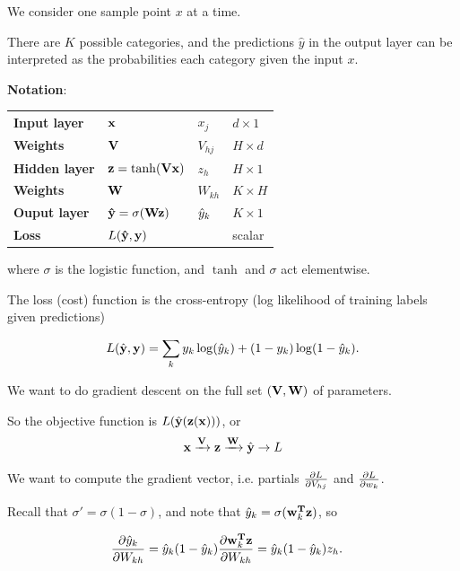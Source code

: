 \documentclass[12pt]{article}
\begin{document}
We consider one sample point $x$ at a time.

There are $K$ possible categories, and the predictions $\hat y$ in the output
layer can be interpreted as the probabilities each category given the input $x$.

\textbf{Notation}:

\begin{tabular}{l|l|l|l}
  \textbf{Input layer}  & $\mathbf x$                             & $x_j$     & $d \times 1$ \\
  \textbf{Weights}      & $\mathbf V$                         & $V_{hj}$  & $H \times d$ \\
  \textbf{Hidden layer} & $\mathbf z = \tanh(\mathbf V \mathbf x)$          & $z_h$     & $H \times 1$ \\
  \textbf{Weights}      & $\mathbf W$                         & $W_{kh}$  & $K \times H$ \\
  \textbf{Ouput layer}  & $\mathbf {\hat{y}} = \sigma(\mathbf W \mathbf z)$ & $\hat{y}_k$ & $K \times 1$ \\
  \textbf{Loss}         & $L(\mathbf {\hat{y}}, \mathbf y)$          &           & scalar \\
\end{tabular}

where $\sigma$ is the logistic function, and $\tanh$ and $\sigma$ act elementwise.

The loss (cost) function is the cross-entropy (log likelihood of training labels given
predictions)

\begin{align*}
  L(\hat{\mathbf y}, \mathbf y) = \sum_k y_k \log(\hat y_k) + (1 - y_k) \log( 1 - \hat y_k).
\end{align*}

We want to do gradient descent on the full set $(\mathbf V, \mathbf W)$ of parameters.

So the objective function is $L({\hat {\mathbf y}}(\mathbf z(\mathbf x)))$, or
\begin{align*}
  \mathbf x \xrightarrow{\mathbf V} \mathbf z \xrightarrow{\mathbf W} \hat {\mathbf y} \rightarrow L
\end{align*}

We want to compute the gradient vector, i.e. partials $\frac{\partial L}{\partial V_{hj}}$
and $\frac{\partial L}{\partial w_k}$.

Recall that $\sigma' = \sigma (1 - \sigma)$, and note that
$\hat{y}_k = \sigma(\mathbf w_k^{\mathbf{T}} \mathbf z)$, so

\begin{align*}
  \frac{\partial \hat{y}_k}{\partial W_{kh}} &= \hat{y}_k (1 - \hat{y}_k) \frac{\partial \mathbf w_k^{\mathbf{T}} \mathbf z}{\partial W_{kh}} = \hat{y}_k (1 - \hat{y}_k)z_h.
\end{align*}
\end{document}
